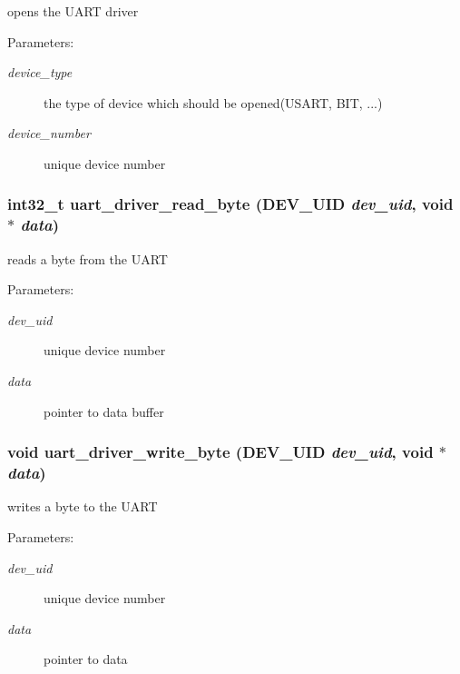 opens the UART driver 

\begin{Desc}
\item[Parameters:]
\begin{description}
\item[{\em device\_\-type}]the type of device which should be opened(USART, BIT, ...) \item[{\em device\_\-number}]unique device number \end{description}
\end{Desc}
\hypertarget{group___u_a_r_t___d_r_i_v_e_r_ga6928ddd61de1141bef635bdf78c178a}{
\subsubsection[{uart\_\-driver\_\-read\_\-byte}]{\setlength{\rightskip}{0pt plus 5cm}int32\_\-t uart\_\-driver\_\-read\_\-byte ({\bf DEV\_\-UID} {\em dev\_\-uid}, \/  void $\ast$ {\em data})}}
\label{group___u_a_r_t___d_r_i_v_e_r_ga6928ddd61de1141bef635bdf78c178a}


reads a byte from the UART 

\begin{Desc}
\item[Parameters:]
\begin{description}
\item[{\em dev\_\-uid}]unique device number \item[{\em data}]pointer to data buffer \end{description}
\end{Desc}
\hypertarget{group___u_a_r_t___d_r_i_v_e_r_gfa04867da082deef4ff11e19691b0a7d}{
\subsubsection[{uart\_\-driver\_\-write\_\-byte}]{\setlength{\rightskip}{0pt plus 5cm}void uart\_\-driver\_\-write\_\-byte ({\bf DEV\_\-UID} {\em dev\_\-uid}, \/  void $\ast$ {\em data})}}
\label{group___u_a_r_t___d_r_i_v_e_r_gfa04867da082deef4ff11e19691b0a7d}


writes a byte to the UART 

\begin{Desc}
\item[Parameters:]
\begin{description}
\item[{\em dev\_\-uid}]unique device number \item[{\em data}]pointer to data \end{description}
\end{Desc}
